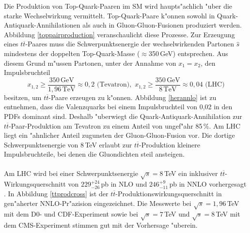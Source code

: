 Die Produktion von Top-Quark-Paaren im SM wird haupts"achlich "uber die starke Wechselwirkung vermittelt. Top-Quark-Paare k"onnen sowohl in Quark-Antiquark-Annihilationen als auch in Gluon-Gluon-Fusionen produziert werden. Abbildung \ref{toppairproduction} veranschaulicht diese Prozesse. Zur Erzeugung eines $t\overline{t}$-Paares muss die Schwerpunkts\-energie der wechselwirkenden Partonen $\hat{s}$ mindestens der doppelten Top-Quark-Masse ($\approx$350\,GeV) entsprechen. Aus diesem Grund m"ussen Partonen, unter der Annahme von $x_{1}=x_{2}$, den Impulsbruchteil
\begin{equation}
x_{1,2}\geq \frac{350\,\text{GeV}}{1,96\,\text{TeV}}\approx 0,2 \text{ (Tevatron)},\,\,x_{1,2}\geq \frac{350\,\text{GeV}}{8\,\text{TeV}}\approx 0,04 \text{ (LHC)}
\end{equation}
besitzen, um $t\overline{t}$-Paare erzeugen zu k"onnen. Abbildung \ref{herannlo} ist zu entnehmen, dass die Valenz\-quarks bei einem Impulsbruchteil von 0,02 in den PDFs dominant sind. Deshalb "uberwiegt die Quark-Antiquark-Annihilation zur $t\overline{t}$-Paar-Produktion am Tevatron zu ei\-nem Anteil von ungef"ahr 85\,\%. Am LHC liegt ein "ahnlicher Anteil zugunsten der Gluon-Gluon-Fusion vor. Die dortige Schwerpunkts\-energie von 8\,TeV erlaubt zur $t\overline{t}$-Produktion kleinere Impulsbruchteile, bei denen die Gluondichten steil ansteigen.
\\
\\
Am LHC wird bei einer Schwerpunkts\-energie $\sqrt{s}=8$\,TeV ein inklusiver $t\overline{t}$-Wirkungs\-querschnitt von $229_{-26}^{+24}$\,pb in NLO \cite{Cacciari:2011hy} und $246_{-11}^{+9}$\,pb in NNLO vorhergesagt \cite{Czakon:2013goa}. In Abbildung \ref{ttprodcross} ist der $t\overline{t}$-Produktionswirkungsquerschnitt in gen"aherter NNLO-Pr"azision eingezeichnet. Die Messwerte bei $\sqrt{s}=1,96$\,TeV mit dem D0- und CDF-Experiment sowie bei $\sqrt{s}=7$\,TeV und $\sqrt{s}=8$\,TeV mit dem CMS-Experiment stimmen gut mit der Vorhersage "uberein.\\
\\
